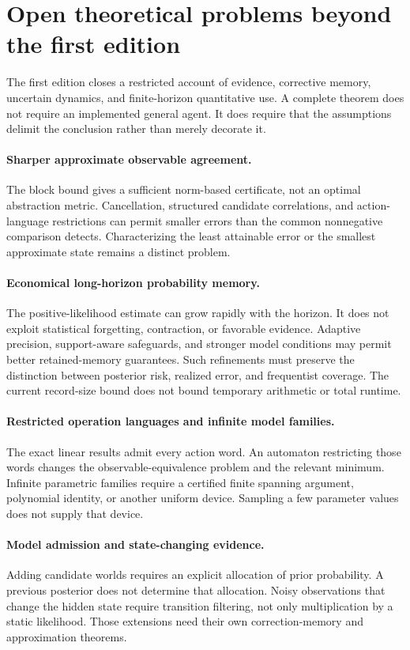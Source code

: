 \section{Open theoretical problems beyond the first edition}\label{GA:sec:open}
The first edition closes a restricted account of evidence, corrective memory, uncertain dynamics, and finite-horizon quantitative use. A complete theorem does not require an implemented general agent. It does require that the assumptions delimit the conclusion rather than merely decorate it.

\paragraph{Sharper approximate observable agreement.} The block bound gives a sufficient norm-based certificate, not an optimal abstraction metric. Cancellation, structured candidate correlations, and action-language restrictions can permit smaller errors than the common nonnegative comparison detects. Characterizing the least attainable error or the smallest approximate state remains a distinct problem.

\paragraph{Economical long-horizon probability memory.} The positive-likelihood estimate can grow rapidly with the horizon. It does not exploit statistical forgetting, contraction, or favorable evidence. Adaptive precision, support-aware safeguards, and stronger model conditions may permit better retained-memory guarantees. Such refinements must preserve the distinction between posterior risk, realized error, and frequentist coverage. The current record-size bound does not bound temporary arithmetic or total runtime.

\paragraph{Restricted operation languages and infinite model families.} The exact linear results admit every action word. An automaton restricting those words changes the observable-equivalence problem and the relevant minimum. Infinite parametric families require a certified finite spanning argument, polynomial identity, or another uniform device. Sampling a few parameter values does not supply that device.

\paragraph{Model admission and state-changing evidence.} Adding candidate worlds requires an explicit allocation of prior probability. A previous posterior does not determine that allocation. Noisy observations that change the hidden state require transition filtering, not only multiplication by a static likelihood. Those extensions need their own correction-memory and approximation theorems.

